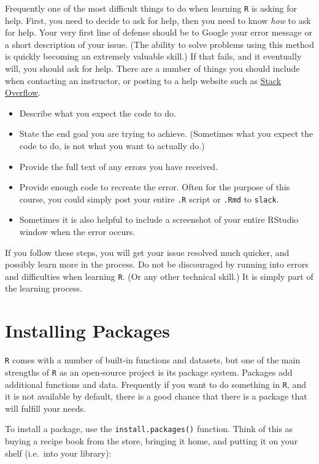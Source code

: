 \documentclass[]{book}
\providecommand{\tightlist}{%
  \setlength{\itemsep}{0pt}\setlength{\parskip}{0pt}}
\begin{document}
Frequently one of the most difficult things to do when learning \texttt{R} is asking for help. First, you need to decide to ask for help, then you need to know \emph{how} to ask for help. Your very first line of defense should be to Google your error message or a short description of your issue. (The ability to solve problems using this method is quickly becoming an extremely valuable skill.) If that fails, and it eventually will, you should ask for help. There are a number of things you should include when contacting an instructor, or posting to a help website such as \href{https://stackoverflow.com}{Stack Overflow}.

\begin{itemize}
\tightlist
\item
  Describe what you expect the code to do.
\item
  State the end goal you are trying to achieve. (Sometimes what you expect the code to do, is not what you want to actually do.)
\item
  Provide the full text of any errors you have received.
\item
  Provide enough code to recreate the error. Often for the purpose of this course, you could simply post your entire \texttt{.R} script or \texttt{.Rmd} to \texttt{slack}.
\item
  Sometimes it is also helpful to include a screenshot of your entire RStudio window when the error occurs.
\end{itemize}

If you follow these steps, you will get your issue resolved much quicker, and possibly learn more in the process. Do not be discouraged by running into errors and difficulties when learning \texttt{R}. (Or any other technical skill.) It is simply part of the learning process.

\hypertarget{installing-packages}{%
\section{Installing Packages}\label{installing-packages}}

\texttt{R} comes with a number of built-in functions and datasets, but one of the main strengths of \texttt{R} as an open-source project is its package system. Packages add additional functions and data. Frequently if you want to do something in \texttt{R}, and it is not available by default, there is a good chance that there is a package that will fulfill your needs.

To install a package, use the \texttt{install.packages()} function. Think of this as buying a recipe book from the store, bringing it home, and putting it on your shelf (i.e.~into your library):
\end{document}
